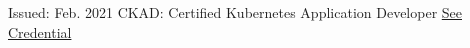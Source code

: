 

\begin{cventries}

  \cventry
    {
      Issued: Feb. 2021
    }
    {
      CKAD: Certified Kubernetes Application Developer
    }
    {
      \href{https://www.youracclaim.com/badges/ecfe2a24-2559-4e1e-9168-52e2e8dd4253}{See Credential}
    }
    {
    }
    {
    }
\end{cventries}
